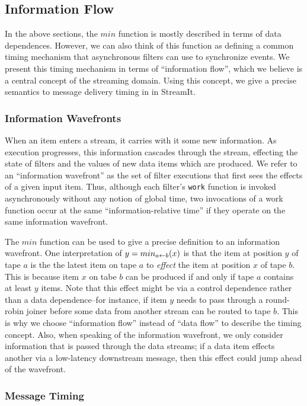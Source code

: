 \subsection{Information Flow}

In the above sections, the $min$ function is mostly described in terms
of data dependences.  However, we can also think of this function as
defining a common timing mechanism that asynchronous filters can use
to synchronize events.  We present this timing mechanism in terms of
``information flow'', which we believe is a central concept of the
streaming domain.  Using this concept, we give a precise semantics to
message delivery timing in in StreamIt.

\subsubsection{Information Wavefronts}

When an item enters a stream, it carries with it some new information.
As execution progresses, this information cascades through the stream,
effecting the state of filters and the values of new data items which
are produced.  We refer to an ``information wavefront'' as the set of
filter executions that first sees the effects of a given input item.
Thus, although each filter's {\tt work} function is invoked
asynchronously without any notion of global time, two invocations of a
work function occur at the same ``information-relative time'' if they
operate on the same information wavefront.

The $min$ function can be used to give a precise definition to an
information wavefront.  One interpretation of $y = min_{a \leftarrow b}(x)$ is
that the item at position $y$ of tape $a$ is the the latest item on
tape $a$ to {\it effect} the item at position $x$ of tape $b$.  This
is because item $x$ on tabe $b$ can be produced if and only if tape
$a$ contains at least $y$ items.  Note that this effect might be via a
control dependence rather than a data dependence--for instance, if
item $y$ needs to pass through a round-robin joiner before some data
from another stream can be routed to tape $b$.  This is why we choose
``information flow'' instead of ``data flow'' to describe the timing
concept.  Also, when speaking of the information wavefront, we only
consider information that is passed through the data streams; if a
data item effects another via a low-latency downstream message, then
this effect could jump ahead of the wavefront.

\subsubsection{Message Timing}


